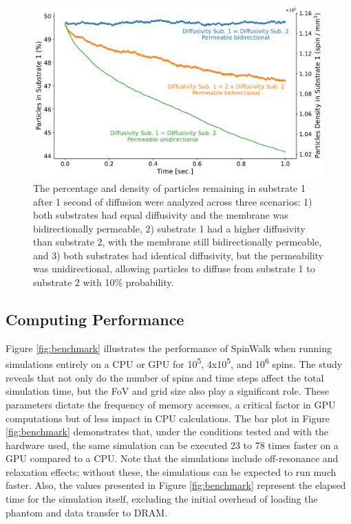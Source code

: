 \begin{figure}[!htbp]
    \centering
    \includegraphics[width=\textwidth]{fig8_diffusion_bias.pdf}
    \caption{The percentage and density of particles remaining in substrate 1 after 1 second of diffusion were analyzed across three scenarios: 1) both substrates had equal diffusivity and the membrane was bidirectionally permeable, 2) substrate 1 had a higher diffusivity than substrate 2, with the membrane still bidirectionally permeable, and 3) both substrates had identical diffusivity, but the permeability was unidirectional, allowing particles to diffuse from substrate 1 to substrate 2 with 10\% probability.}
    \label{fig:diffusion_bias}
\end{figure}

\subsection*{Computing Performance}

Figure \ref{fig:benchmark} illustrates the performance of SpinWalk when running simulations entirely on a CPU or GPU for 10\textsuperscript{5}, 4x10\textsuperscript{5}, and 10\textsuperscript{6} spins. The study reveals that not only do the number of spins and time steps affect the total simulation time, but the FoV and grid size also play a significant role. These parameters dictate the frequency of memory accesses, a critical factor in GPU computations but of less impact in CPU calculations. The bar plot in Figure \ref{fig:benchmark} demonstrates that, under the conditions tested and with the hardware used, the same simulation can be executed 23 to 78 times faster on a GPU compared to a CPU. Note that the simulations include off-resonance and relaxation effects; without these, the simulations can be expected to run much faster. Also, the values presented in Figure \ref{fig:benchmark} represent the elapsed time for the simulation itself, excluding the initial overhead of loading the phantom and data transfer to DRAM.

